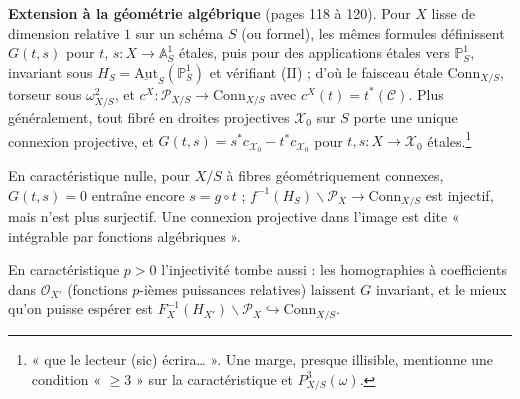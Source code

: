 \documentclass[11pt,a4paper]{article}
\begin{document}
\textbf{Extension à la géométrie algébrique} (pages 118 à 120). Pour $X$ lisse
de dimension relative $1$ sur un schéma $S$ (ou formel), les mêmes formules
définissent $G(t,s)$ pour $t$, $s : X \to \mathbb{A}^1_S$ étales, puis pour des
applications étales vers $\mathbb{P}^1_S$, invariant sous
$H_S = \underline{\mathrm{Aut}}_S(\mathbb{P}^1_S)$ et vérifiant (II) ; d'où le faisceau
étale $\mathrm{Conn}_{X/S}$, torseur sous $\omega_{X/S}^2$, et
$c^X : \mathcal{P}_{X/S} \to \mathrm{Conn}_{X/S}$ avec $c^X(t) = t^*(\mathcal{C})$.
Plus généralement, tout fibré en droites projectives $\mathcal{X}_0$ sur $S$
porte une unique connexion projective, et $G(t,s) = s^*c_{\mathcal{X}_0} -
t^*c_{\mathcal{X}_0}$ pour $t, s : X \to \mathcal{X}_0$ étales.\footnote{« que le
lecteur (sic) écrira… ». Une marge, presque illisible, mentionne une condition
« $\geq 3$ » sur la caractéristique et $P^3_{X/S}(\omega)$.}

En caractéristique nulle, pour $X/S$ à fibres géométriquement connexes,
$G(t,s) = 0$ entraîne encore $s = g \circ t$ ; $f^{-1}(H_S)\backslash\mathcal{P}_X
\to \mathrm{Conn}_{X/S}$ est injectif, mais n'est plus surjectif. Une connexion
projective dans l'image est dite « intégrable par fonctions algébriques ».

En caractéristique $p > 0$ l'injectivité tombe aussi : les homographies à
coefficients dans $\mathcal{O}_{X'}$ (fonctions $p$-ièmes puissances relatives)
laissent $G$ invariant, et le mieux qu'on puisse espérer est
$F_X^{-1}(H_{X'})\backslash\mathcal{P}_X \hookrightarrow \mathrm{Conn}_{X/S}$.
\end{document}
